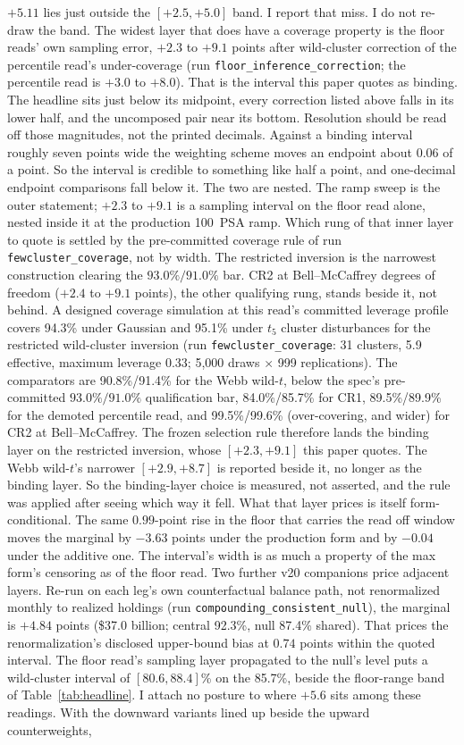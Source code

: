 \documentclass[12pt]{article}
\begin{document}
$+5.11$ lies just outside the $[+2.5, +5.0]$ band. I report that miss. I do not re-draw the band. The widest layer that does have a coverage property is the floor reads' own sampling error, $+2.3$ to $+9.1$ points after wild-cluster correction of the percentile read's under-coverage (run \texttt{floor\_inference\_correction}; the percentile read is $+3.0$ to $+8.0$). That is the interval this paper quotes as binding. The headline sits just below its midpoint, every correction listed above falls in its lower half, and the uncomposed pair near its bottom. Resolution should be read off those magnitudes, not the printed decimals. Against a binding interval roughly seven points wide the weighting scheme moves an endpoint about $0.06$ of a point. So the interval is credible to something like half a point, and one-decimal endpoint comparisons fall below it. The two are nested. The ramp sweep is the outer statement; $+2.3$ to $+9.1$ is a sampling interval on the floor read alone, nested inside it at the production 100~PSA ramp. Which rung of that inner layer to quote is settled by the pre-committed coverage rule of run \texttt{fewcluster\_coverage}, not by width. The restricted inversion is the narrowest construction clearing the $93.0\%/91.0\%$ bar. CR2 at Bell--McCaffrey degrees of freedom ($+2.4$ to $+9.1$ points), the other qualifying rung, stands beside it, not behind. A designed coverage simulation at this read's committed leverage profile covers 94.3\% under Gaussian and 95.1\% under $t_5$ cluster disturbances for the restricted wild-cluster inversion (run \texttt{fewcluster\_coverage}: 31 clusters, 5.9 effective, maximum leverage 0.33; 5{,}000 draws $\times$ 999 replications). The comparators are 90.8\%/91.4\% for the Webb wild-$t$, below the spec's pre-committed $93.0\%/91.0\%$ qualification bar, 84.0\%/85.7\% for CR1, 89.5\%/89.9\% for the demoted percentile read, and 99.5\%/99.6\% (over-covering, and wider) for CR2 at Bell--McCaffrey. The frozen selection rule therefore lands the binding layer on the restricted inversion, whose $[+2.3, +9.1]$ this paper quotes. The Webb wild-$t$'s narrower $[+2.9, +8.7]$ is reported beside it, no longer as the binding layer. So the binding-layer choice is measured, not asserted, and the rule was applied after seeing which way it fell. What that layer prices is itself form-conditional. The same $0.99$-point rise in the floor that carries the read off window moves the marginal by $-3.63$ points under the production form and by $-0.04$ under the additive one. The interval's width is as much a property of the max form's censoring as of the floor read. Two further v20 companions price adjacent layers. Re-run on each leg's own counterfactual balance path, not renormalized monthly to realized holdings (run \texttt{compounding\_consistent\_null}), the marginal is $+4.84$ points (\$37.0 billion; central 92.3\%, null 87.4\% shared). That prices the renormalization's disclosed upper-bound bias at $0.74$ points within the quoted interval. The floor read's sampling layer propagated to the null's level puts a wild-cluster interval of $[80.6, 88.4]$\% on the 85.7\%, beside the floor-range band of Table~\ref{tab:headline}. I attach no posture to where $+5.6$ sits among these readings. With the downward variants lined up beside the upward counterweights, 
\end{document}
